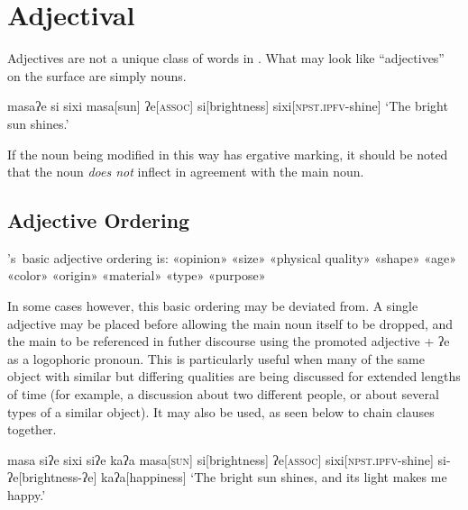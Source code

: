 \chapter{Adjectival}\label{ch:adjectives}
Adjectives are not a unique class of words in \langname . What may look like ``adjectives'' on the surface are simply nouns.

\ex
\begingl
\glpreamble masaʔe si sixi
\endpreamble
\nogloss{\lbrack}
masa[sun]
ʔe[\textsc{assoc}]
si[brightness]
\nogloss{\rbrack}
sixi[\textsc{npst.ipfv}-shine]
\glft `The bright sun shines.'
\endgl
\xe

If the noun being modified in this way has ergative marking, it should be noted that the noun \textit{does not} inflect in agreement with the main noun.

\section{Adjective Ordering}

\langname 's\ basic adjective ordering is: «opinion» «size» «physical quality» «shape» «age» «color» «origin» «material» «type» «purpose»

In some cases however, this basic ordering may be deviated from. A single adjective may be placed before  allowing the main noun itself to be dropped, and the main to be referenced in futher discourse using the promoted adjective + ʔe as a logophoric pronoun. This is particularly useful when many of the same object with similar but differing qualities are being discussed for extended lengths of time (for example, a discussion about two different people, or about several types of a similar object). It may also be used, as seen below to chain clauses together.

\ex
\begingl
\glpreamble masa siʔe sixi siʔe kaʔa
\endpreamble
\nogloss{\lbrack}
masa[\textsc{sun}]
si[brightness]
ʔe[\textsc{assoc}]
\nogloss{\rbrack}
sixi[\textsc{npst.ipfv}-shine]
si-ʔe[brightness-ʔe]
kaʔa[happiness]
\glft `The bright sun shines, and its light makes me happy.'
\endgl
\xe

